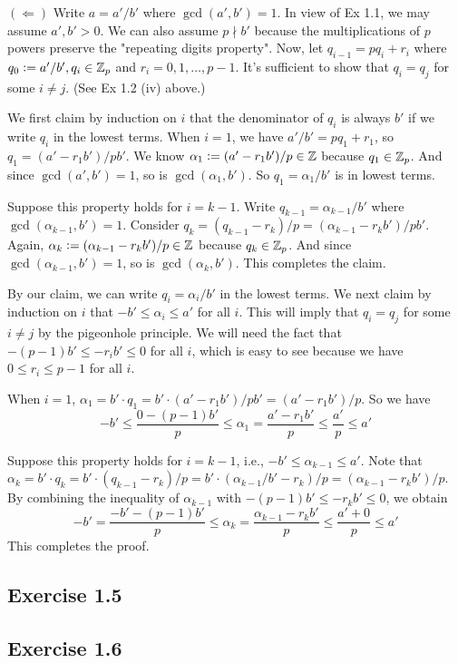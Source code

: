\documentclass[../Koblitz.tex]{subfiles}
\begin{document}
$(\Leftarrow)$ Write $a=a'/b'$ where $\gcd(a',b')=1$. In view of Ex 1.1, we may assume $a',b'>0$. We can also assume $p\nmid b'$ because the multiplications of $p$ powers preserve the "repeating digits property". Now, let $q_{i-1}=pq_i+r_i$ where $q_0:=a'/b',q_i\in\mathbb{Z}_p$ and $r_i=0,1,\ldots,p-1$. It's sufficient to show that $q_i=q_j$ for some $i\neq j$.  (See Ex 1.2 (iv) above.)

We first claim by induction on $i$ that the denominator of $q_i$ is always $b'$ if we write $q_i$ in the lowest terms. When $i=1$, we have $a'/b'=pq_1+r_1$, so $q_1=(a'-r_1b')/pb'$. We know $\alpha_1:=(a'-r_1b')/p\in\mathbb{Z}$ because $q_1\in\mathbb{Z}_p$. And since $\gcd(a',b')=1$, so is $\gcd(\alpha_1,b')$. So $q_1=\alpha_1/b'$ is in lowest terms.

Suppose this property holds for $i=k-1$. Write $q_{k-1}=\alpha_{k-1}/b'$ where $\gcd(\alpha_{k-1},b')=1$. Consider $q_k=(q_{k-1}-r_k)/p=(\alpha_{k-1}-r_kb')/pb'$. Again, $\alpha_k:=(\alpha_{k-1}-r_kb')/p\in\mathbb{Z}$ because $q_k\in\mathbb{Z}_p$. And since $\gcd(\alpha_{k-1},b')=1$, so is $\gcd(\alpha_k,b')$. This completes the claim.

By our claim, we can write $q_i=\alpha_i/b'$ in the lowest terms. We next claim by induction on $i$ that $-b'\leq \alpha_i\leq a'$ for all $i$. This will imply that $q_i=q_j$ for some $i\neq j$ by the pigeonhole principle. We will need the fact that $-(p-1)b'\leq-r_ib'\leq 0$ for all $i$, which is easy to see because we have $0\leq r_i\leq p-1$ for all $i$.

When $i=1$, $\alpha_1=b'\cdot q_1=b'\cdot(a'-r_1b')/pb'=(a'-r_1b')/p$. So we have $$-b'\leq\frac{0-(p-1)b'}{p}\leq\alpha_1 = \frac{a'-r_1b'}{p} \leq \frac{a'}{p} \leq a'$$

Suppose this property holds for $i=k-1$, i.e., $-b'\leq\alpha_{k-1}\leq a'$. Note that $\alpha_k=b'\cdot q_k=b'\cdot(q_{k-1}-r_k)/p=b'\cdot(\alpha_{k-1}/b'-r_k)/p=(\alpha_{k-1}-r_kb')/p$. By combining the inequality of $\alpha_{k-1}$ with $-(p-1)b'\leq -r_kb'\leq 0$, we obtain $$-b'=\frac{-b'-(p-1)b'}{p} \leq \alpha_k=\frac{\alpha_{k-1}-r_kb'}{p} \leq \frac{a'+0}{p} \leq a'$$ This completes the proof.

\subsection*{Exercise 1.5}

\subsection*{Exercise 1.6}
\end{document}
